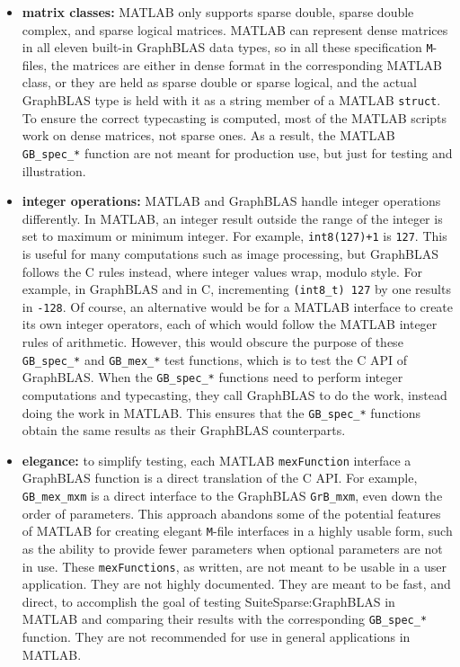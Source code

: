\documentclass[12pt]{article}
\begin{document}
\begin{itemize}
\item {\bf matrix classes:} MATLAB only supports sparse double, sparse double
    complex, and sparse logical matrices.  MATLAB can represent dense matrices
    in all eleven built-in GraphBLAS data types, so in all these specification
    \verb'M'-files, the matrices are either in dense format in the
    corresponding MATLAB class, or they are held as sparse double or sparse
    logical, and the actual GraphBLAS type is held with it as a string member
    of a MATLAB \verb'struct'.  To ensure the correct typecasting is computed,
    most of the MATLAB scripts work on dense matrices, not sparse ones.  As a
    result, the MATLAB \verb'GB_spec_*' function are not meant for production
    use, but just for testing and illustration.

\item {\bf integer operations:}  MATLAB and GraphBLAS handle integer operations
    differently.  In MATLAB, an integer result outside the range of the integer
    is set to maximum or minimum integer.  For example, \verb'int8(127)+1' is
    \verb'127'.  This is useful for many computations such as image processing,
    but GraphBLAS follows the C rules instead, where integer values wrap,
    modulo style.  For example, in GraphBLAS and in C, incrementing
    \verb'(int8_t) 127' by one results in \verb'-128'.  Of course, an
    alternative would be for a MATLAB interface to create its own integer
    operators, each of which would follow the MATLAB integer rules of
    arithmetic.  However, this would obscure the purpose of these
    \verb'GB_spec_*' and \verb'GB_mex_*' test functions, which is to test the C
    API of GraphBLAS.  When the \verb'GB_spec_*' functions need to perform
    integer computations and typecasting, they call GraphBLAS to do the work,
    instead doing the work in MATLAB.  This ensures that the \verb'GB_spec_*'
    functions obtain the same results as their GraphBLAS counterparts.

\item {\bf elegance:}  to simplify testing, each MATLAB \verb'mexFunction'
    interface a GraphBLAS function is a direct translation of the C API.  For
    example, \verb'GB_mex_mxm' is a direct interface to the GraphBLAS
    \verb'GrB_mxm', even down the order of parameters.  This approach
    abandons some of the potential features of MATLAB for creating elegant
    \verb'M'-file interfaces in a highly usable form, such as the ability to
    provide fewer parameters when optional parameters are not in use.  These
    \verb'mexFunctions', as written, are not meant to be usable in a user
    application.  They are not highly documented.  They are meant to be fast,
    and direct, to accomplish the goal of testing SuiteSparse:GraphBLAS in
    MATLAB and comparing their results with the corresponding \verb'GB_spec_*'
    function.  They are not recommended for use in general applications in
    MATLAB.


\end{itemize}
\end{document}
